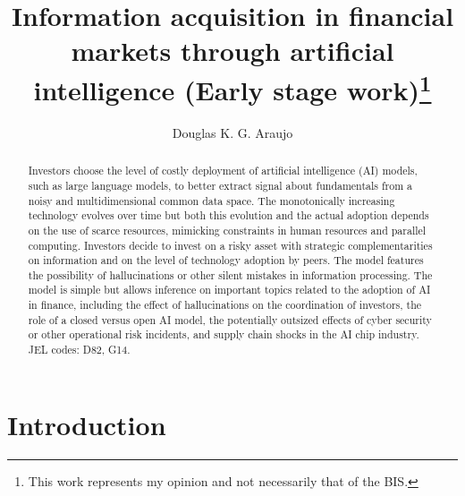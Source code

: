\documentclass[
]{article}
\title{Information acquisition in financial markets through artificial
intelligence (Early stage work)\thanks{This work represents my opinion
and not necessarily that of the BIS.}}
\author{Douglas K. G. Araujo}
\affil{%
                  Bank for International
Settlements, douglas.araujo@bis.org
              }
\date{}
\theoremstyle{plain}
\theoremstyle{remark}
\begin{document}
\maketitle
\begin{abstract}
Investors choose the level of costly deployment of artificial
intelligence (AI) models, such as large language models, to better
extract signal about fundamentals from a noisy and multidimensional
common data space. The monotonically increasing technology evolves over
time but both this evolution and the actual adoption depends on the use
of scarce resources, mimicking constraints in human resources and
parallel computing. Investors decide to invest on a risky asset with
strategic complementarities on information and on the level of
technology adoption by peers. The model features the possibility of
hallucinations or other silent mistakes in information processing. The
model is simple but allows inference on important topics related to the
adoption of AI in finance, including the effect of hallucinations on the
coordination of investors, the role of a closed versus open AI model,
the potentially outsized effects of cyber security or other operational
risk incidents, and supply chain shocks in the AI chip industry. JEL
codes: D82, G14.
\end{abstract}

\section{Introduction}\label{introduction}
\end{document}
